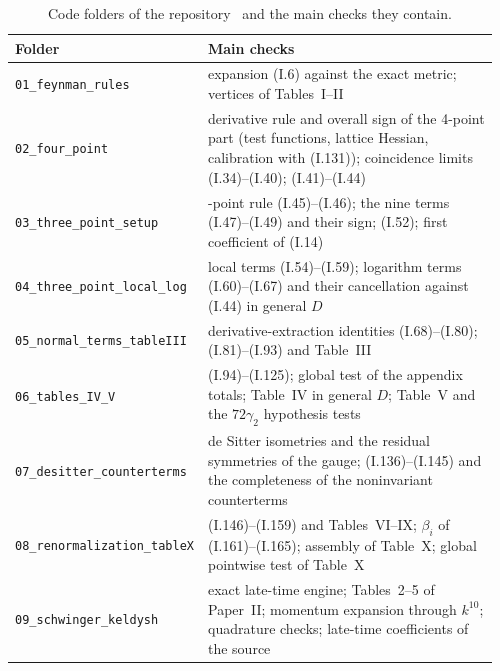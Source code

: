 \documentclass[aps,prd,onecolumn,10pt,nofootinbib,floatfix]{revtex4-2}
\newcommand{\eqI}[1]{(I.#1)}
\begin{document}
\begin{table}[tb]
\caption{Code folders of the repository~\cite{ref:repo} and the main checks they contain.}
\label{tab:s0s1s7s8:code}
\renewcommand{\arraystretch}{1.25}
\small
\begin{ruledtabular}
\begin{tabular}{@{}>{\raggedright\arraybackslash}p{0.26\linewidth}>{\raggedright\arraybackslash}p{0.70\linewidth}@{}}
Folder & Main checks\\
\hline
\texttt{01\_feynman\_rules} & expansion \eqI{6} against the exact metric; vertices of Tables~I--II\\
\texttt{02\_four\_point} & derivative rule and overall sign of the 4-point part (test functions, lattice Hessian, calibration with
\eqI{131}); coincidence limits \eqI{34}--\eqI{40}; \eqI{41}--\eqI{44}\\
\texttt{03\_three\_point\_setup} & 3-point rule \eqI{45}--\eqI{46}; the nine terms \eqI{47}--\eqI{49} and their sign; \eqI{52};
first coefficient of \eqI{14}\\
\texttt{04\_three\_point\_local\_log} & local terms \eqI{54}--\eqI{59}; logarithm terms \eqI{60}--\eqI{67} and their cancellation
against \eqI{44} in general $D$\\
\texttt{05\_normal\_terms\_tableIII} & derivative-extraction identities \eqI{68}--\eqI{80}; \eqI{81}--\eqI{93} and Table~III\\
\texttt{06\_tables\_IV\_V} & \eqI{94}--\eqI{125}; global test of the appendix totals; Table~IV in general $D$; Table~V and the
$72\gamma_2$ hypothesis tests\\
\texttt{07\_desitter\_counterterms} & de Sitter isometries and the residual symmetries of the gauge; \eqI{136}--\eqI{145} and the
completeness of the noninvariant counterterms\\
\texttt{08\_renormalization\_tableX} & \eqI{146}--\eqI{159} and Tables~VI--IX; $\beta_i$ of \eqI{161}--\eqI{165}; assembly of Table~X;
global pointwise test of Table~X\\
\texttt{09\_schwinger\_keldysh} & exact late-time engine; Tables~2--5 of Paper~II; momentum expansion through $k^{10}$; quadrature
checks; late-time coefficients of the source\\
\end{tabular}
\end{ruledtabular}
\end{table}
\end{document}
